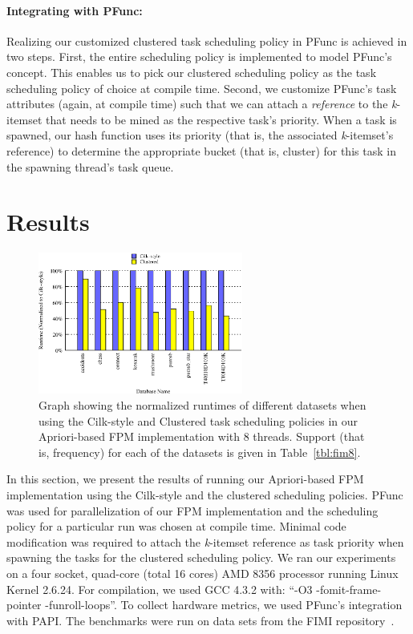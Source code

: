 \documentclass{IOS-Book-Article}
\begin{document}
\paragraph{Integrating with PFunc:} Realizing our customized clustered task
scheduling policy in PFunc is achieved in two steps. 
First, the entire scheduling policy is implemented to model PFunc's 
 concept. This enables us to pick our clustered scheduling
policy as the task scheduling policy of choice at compile time. 
Second, we customize PFunc's task attributes (again, at compile time) such that
we can attach a \textit{reference} to the \textit{k}-itemset that needs to be
mined as the respective task's priority. When a task is spawned, our hash
function uses its priority (that is, the associated \textit{k}-itemset's
reference) to determine the appropriate bucket (that is, cluster) for this task
in the spawning thread's task queue.

\section{Results}
\label{sec:results}

\begin{figure}[t]
\includegraphics[width=0.6\textwidth]{figs/fim_8}
\caption{Graph showing the normalized runtimes of different datasets when using
the Cilk-style and Clustered task scheduling policies in our Apriori-based
FPM implementation with 8 threads. Support (that is, frequency) for each of
the datasets is given in Table~\ref{tbl:fim8}.}
\label{fig:fim8}
\end{figure}

In this section, we present the results of running our Apriori-based FPM
implementation using the Cilk-style and the clustered scheduling policies.
PFunc was used for parallelization of our FPM implementation and the scheduling
policy for a particular run was chosen at compile time. Minimal code
modification was required to attach the \textit{k}-itemset reference as task
priority when spawning the tasks for the clustered scheduling policy.
We ran our experiments on a four socket, quad-core (total 16 cores) AMD 8356
processor running Linux Kernel 2.6.24.  For compilation, we used GCC 4.3.2
with: ``-O3 -fomit-frame-pointer -funroll-loops''. To collect hardware
metrics, we used PFunc's integration with PAPI.  The benchmarks were run on
data sets from the FIMI repository~\cite{bart:2004}.
\end{document}
